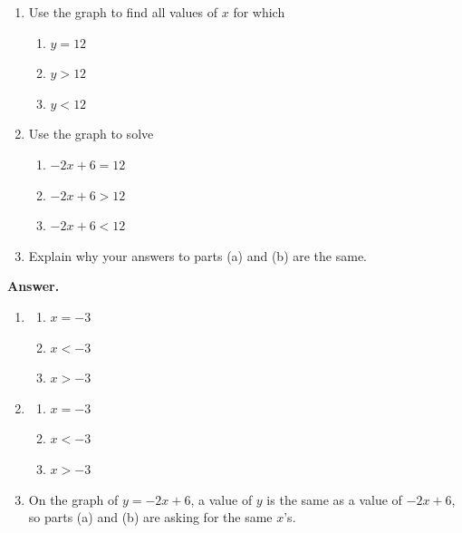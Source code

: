 \documentclass[10pt,]{book}
\theoremstyle{plain}
\theoremstyle{definition}
\theoremstyle{definition}
\theoremstyle{definition}
\theoremstyle{definition}
\numberwithin{equation}{part}
\newcommand{\lt}{<}
\newcommand{\gt}{>}
\begin{document}
\begin{exerciselist}
 \leavevmode%
\begin{enumerate}[label=*\alph**]
\item\hypertarget{li-740}{}Use the graph to find all values of \(x\) for which %
\begin{enumerate}[label=*\roman**]
\item\hypertarget{li-741}{}\(y=12\)%
\item\hypertarget{li-742}{}\(y\gt 12\)%
\item\hypertarget{li-743}{}\(y\lt 12\)%
\end{enumerate}
%
\item\hypertarget{li-744}{}Use the graph to solve %
\begin{enumerate}[label=*\roman**]
\item\hypertarget{li-745}{}\(-2x + 6=12\)%
\item\hypertarget{li-746}{}\(-2x + 6\gt 12\)%
\item\hypertarget{li-747}{}\(-2x + 6\lt 12\)%
\end{enumerate}
%
\item\hypertarget{li-748}{}Explain why your answers to parts (a) and (b) are the same.%
\end{enumerate}
%
\par\smallskip
\par\smallskip
\noindent\textbf{Answer.}\hypertarget{answer-103}{}\quad
\leavevmode%
\begin{enumerate}[label=*\alph**]
\item\hypertarget{li-749}{}%
\begin{enumerate}[label=*\roman**]
\item\hypertarget{li-750}{}\(x = -3\)%
\item\hypertarget{li-751}{}\(x\lt -3\)%
\item\hypertarget{li-752}{}\(x\gt -3\)%
\end{enumerate}
%
\item\hypertarget{li-753}{}%
\begin{enumerate}[label=*\roman**]
\item\hypertarget{li-754}{}\(x = -3\)%
\item\hypertarget{li-755}{}\(x\lt -3\)%
\item\hypertarget{li-756}{}\(x\gt -3\)%
\end{enumerate}
%
\item\hypertarget{li-757}{}On the graph of \(y=-2x + 6\), a value of \(y\) is the same as a value of \(-2x + 6\), so parts (a) and (b) are asking for the same \(x\)'s.%
\end{enumerate}

\end{exerciselist}
\end{document}
